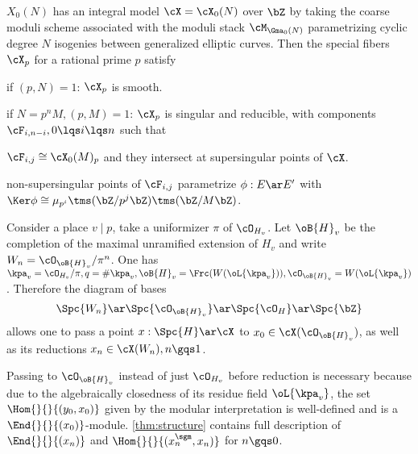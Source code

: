 \documentclass[article, a4paper, twoside]{universal}
\begin{document}
\begin{stp}
	$X_{0}(N)$ has an integral model $\cX=\cX_{0}(N)$ over $\bZ$ by taking the coarse moduli scheme associated with the moduli stack $\cM_{\Gma_{0}(N)}$ parametrizing cyclic degree $N$ isogenies between generalized elliptic curves. Then the special fibers $\cX_{p}$ for a rational prime $p$ satisfy
	\begin{itm}
		\item if $(p,N)=1$: $\cX_{p}$ is smooth.
		\item if $N=p^{n}M, (p,M)=1$: $\cX_{p}$ is singular and reducible, with components $\cF_{i,n-i},0\lqs i\lqs n$ such that
		\begin{enr}
			\item $\cF_{i,j}\cong\cX_{0}(M)_{p}$ and they intersect at supersingular points of $\cX$.
			\item non-supersingular points of $\cF_{i,j}$ parametrize $\phi:E\ar E'$ with $\Ker\phi\cong\mu_{p^{i}}\tms(\bZ/p^{j}\bZ)\tms(\bZ/M\bZ)$.
		\end{enr}
	\end{itm}

	Consider a place $v\mid p$, take a uniformizer $\pi$ of $\cO_{H_{v}}$. Let $\oB{H}_{v}$ be the completion of the maximal unramified extension of $H_{v}$ and write $W_{n}=\cO_{\oB{H}_{v}}/\pi^{n}$. One has $\kpa_{v}=\cO_{H_{v}}/\pi, q=\#\kpa_{v}, \oB{H}_{v}=\Frc(W(\oL{\kpa_{v}})), \cO_{\oB{H}_{v}}=W(\oL{\kpa_{v}})$. Therefore the diagram of bases
	\[
		\Spc{W_{n}}\ar\Spc{\cO_{\oB{H}_{v}}}\ar\Spc{\cO_{H}}\ar\Spc{\bZ}
	\]
	allows one to pass a point $x:\Spc{H}\ar\cX$ to $x_{0}\in \cX(\cO_{\oB{H}_{v}})$, as well as its reductions $x_{n}\in\cX(W_{n}),n\gqs1$.
\end{stp}

\begin{rmk}
	Passing to $\cO_{\oB{H}_{v}}$ instead of just $\cO_{H_{v}}$ before reduction is necessary because due to the algebraically closedness of its residue field $\oL{\kpa_{v}}$, the set $\Hom{}{}{(y_{0},x_{0})}$ given by the modular interpretation is well-defined and is a $\End{}{}{(x_{0})}$-module. \cref{thm:structure} contains full description of $\End{}{}{(x_{n})}$ and $\Hom{}{}{(x_{n}^{\sgm},x_{n})}$ for $n\gqs0$.
\end{rmk}
\end{document}
